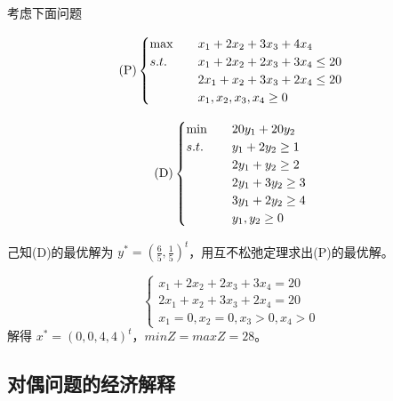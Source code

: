 \begin{example}
    考虑下面问题

    \begin{minipage}[c]{0.45\linewidth}
        \[
            \text{(P)}
            \begin{cases}
                \max \quad &x_1 + 2x_2 + 3x_3 + 4x_4\\
                s.t. \quad &x_1 + 2x_2 + 2x_3 + 3x_4 \le 20\\
                &2x_1 + x_2 + 3x_3 + 2x_4 \le 20\\
                &x_1, x_2, x_3, x_4 \ge 0
            \end{cases}    
        \]
    \end{minipage}
    \begin{minipage}[c]{0.45\linewidth}
        \[
            \text{(D)}
            \begin{cases}
                \min \quad &20y_1 + 20y_2\\
                s.t. \quad &y_1 + 2y_2 \ge 1\\
                &2y_1 + y_2 \ge 2\\
                &2y_1 + 3y_2 \ge 3\\
                &3y_1 + 2y_2 \ge 4\\
                &y_1, y_2 \ge 0
            \end{cases}
        \]
    \end{minipage}

    己知(D)的最优解为 $y^* = \left(\frac{6}{5}, \frac{1}{5}\right)^t$，用互不松弛定理求出(P)的最优解。

    \answer
    \[
        \begin{cases}
            x_1 + 2x_2 + 2x_3 + 3x_4 = 20\\
            2x_1 + x_2 + 3x_3 + 2x_4 = 20\\
            x_1 = 0, x_2 = 0, x_3 > 0, x_4 > 0
        \end{cases}    
    \]
    解得 $x^* = (0, 0, 4, 4)^t$，$minZ = maxZ = 28$。
\end{example}

\subsection{对偶问题的经济解释}
